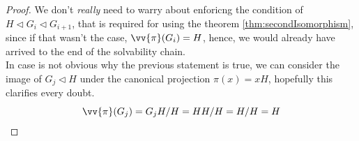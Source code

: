 \begin{proof}
    We don't \emph{really} need to warry about enforicng the condition of $H \triangleleft G_i 
    \triangleleft G_{i+1}$, that is required for using the theorem \ref{thm:secondIsomorphism}, 
    since if that wasn't the case, $\vv{\pi}(G_i) = H$, hence, we would already have arrived 
    to the end of the solvability chain. \\

    In case is not obvious why the previous statement is true, we can consider the image of 
    $G_j \triangleleft H$ under the canonical projection $\pi(x) = xH$, hopefully this 
    clarifies every doubt. \\

    $$ \vv{\pi}(G_j) = G_jH/H = HH/H = H/H = H $$
\end{proof} \vspace{0.2em}

\newpage